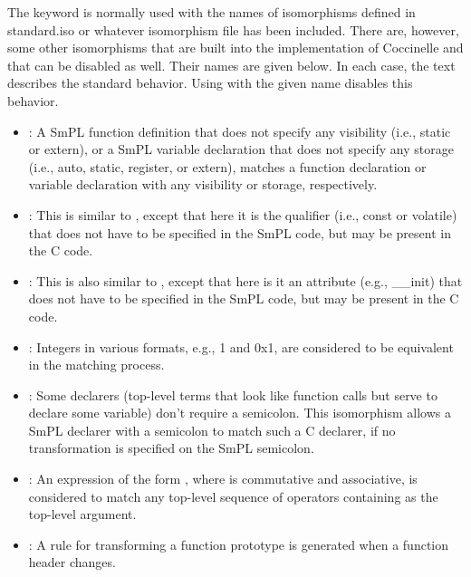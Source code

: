 The keyword  is normally used with the names of
isomorphisms defined in standard.iso or whatever isomorphism file has been
included.  There are, however, some other isomorphisms that are built into
the implementation of Coccinelle and that can be disabled as well.  Their
names are given below.  In each case, the text describes the standard
behavior.  Using  with the given name disables this behavior.

\begin{itemize}
\item {}: A SmPL function definition that does not
  specify any visibility (i.e., static or extern), or a SmPL variable
  declaration that does not specify any storage (i.e., auto, static,
  register, or extern), matches a function declaration or variable
  declaration with any visibility or storage, respectively.
\item {}: This is similar to ,
  except that here it is the qualifier (i.e., const or volatile) that does
  not have to be specified in the SmPL code, but may be present in the C code.
\item {}: This is also similar to
  , except that here is it an attribute (e.g.,
  \_\_init) that does not have to be specified in the SmPL code, but may be
  present in the C code.
\item {}: Integers in various formats, e.g., 1 and 0x1, are
  considered to be equivalent in the matching process.
\item {}: Some declarers (top-level terms
  that look like function calls but serve to declare some variable) don't
  require a semicolon.  This isomorphism allows a SmPL declarer with a semicolon
  to match such a C declarer, if no transformation is specified on the SmPL
  semicolon.
\item {}: An expression of the form  
  , where  is commutative and associative, is
  considered to match any top-level sequence of  operators
  containing  as the top-level argument.
\item {}: A rule for transforming a function prototype is
  generated when a function header changes.
\end{itemize}

